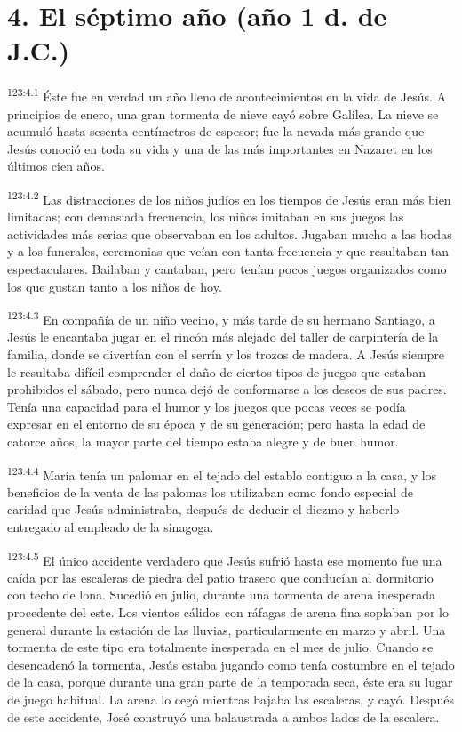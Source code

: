 \section*{4. El séptimo año (año 1 d. de J.C.)}
\par
\textsuperscript{123:4.1} Éste fue en verdad un año lleno de acontecimientos en la vida de Jesús. A principios de enero, una gran tormenta de nieve cayó sobre Galilea. La nieve se acumuló hasta sesenta centímetros de espesor; fue la nevada más grande que Jesús conoció en toda su vida y una de las más importantes en Nazaret en los últimos cien años.

\par
\textsuperscript{123:4.2} Las distracciones de los niños judíos en los tiempos de Jesús eran más bien limitadas; con demasiada frecuencia, los niños imitaban en sus juegos las actividades más serias que observaban en los adultos. Jugaban mucho a las bodas y a los funerales, ceremonias que veían con tanta frecuencia y que resultaban tan espectaculares. Bailaban y cantaban, pero tenían pocos juegos organizados como los que gustan tanto a los niños de hoy.

\par
\textsuperscript{123:4.3} En compañía de un niño vecino, y más tarde de su hermano Santiago, a Jesús le encantaba jugar en el rincón más alejado del taller de carpintería de la familia, donde se divertían con el serrín y los trozos de madera. A Jesús siempre le resultaba difícil comprender el daño de ciertos tipos de juegos que estaban prohibidos el sábado, pero nunca dejó de conformarse a los deseos de sus padres. Tenía una capacidad para el humor y los juegos que pocas veces se podía expresar en el entorno de su época y de su generación; pero hasta la edad de catorce años, la mayor parte del tiempo estaba alegre y de buen humor.

\par
\textsuperscript{123:4.4} María tenía un palomar en el tejado del establo contiguo a la casa, y los beneficios de la venta de las palomas los utilizaban como fondo especial de caridad que Jesús administraba, después de deducir el diezmo y haberlo entregado al empleado de la sinagoga.

\par
\textsuperscript{123:4.5} El único accidente verdadero que Jesús sufrió hasta ese momento fue una caída por las escaleras de piedra del patio trasero que conducían al dormitorio con techo de lona. Sucedió en julio, durante una tormenta de arena inesperada procedente del este. Los vientos cálidos con ráfagas de arena fina soplaban por lo general durante la estación de las lluvias, particularmente en marzo y abril. Una tormenta de este tipo era totalmente inesperada en el mes de julio. Cuando se desencadenó la tormenta, Jesús estaba jugando como tenía costumbre en el tejado de la casa, porque durante una gran parte de la temporada seca, éste era su lugar de juego habitual. La arena lo cegó mientras bajaba las escaleras, y cayó. Después de este accidente, José construyó una balaustrada a ambos lados de la escalera.


